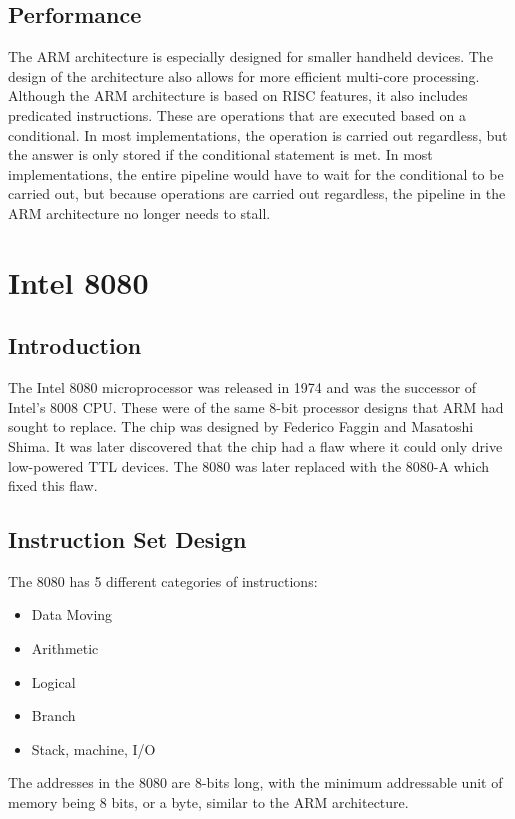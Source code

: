 \documentclass[draftclsnofoot, onecolumn, 10pt, compsoc]{IEEEtran}
\begin{document}
        \subsection{Performance}
            The ARM architecture is especially designed for smaller handheld devices. The design of the architecture also allows for more efficient multi-core processing. Although the ARM architecture is based on RISC features, it also includes predicated instructions. These are operations that are executed based on a conditional. In most implementations, the operation is carried out regardless, but the answer is only stored if the conditional statement is met. In most implementations, the entire pipeline would have to wait for the conditional to be carried out, but because operations are carried out regardless, the pipeline in the ARM architecture no longer needs to stall. 
            ~\cite{ARM:All}
            ~\cite{ARM:Small}
        \newpage
        
    \section{Intel 8080}
            
        \subsection{Introduction}
            The Intel 8080 microprocessor was released in 1974 and was the successor of Intel’s 8008 CPU. These were of the same 8-bit processor designs that ARM had sought to replace. The chip was designed by Federico Faggin and Masatoshi Shima. It was later discovered that the chip had a flaw where it could only drive low-powered TTL devices. The 8080 was later replaced with the 8080-A which fixed this flaw. 
            ~\cite{8080:Intro}

        \subsection{Instruction Set Design}
            The 8080 has 5 different categories of instructions: 
            \begin{itemize}
                \item Data Moving
                \item Arithmetic
                \item Logical
                \item Branch
                \item Stack, machine, I/O
            \end{itemize}
            The addresses in the 8080 are 8-bits long, with the minimum addressable unit of memory being 8 bits, or a byte, similar to the ARM architecture. 
            ~\cite{8080:Instruction}
\end{document}
